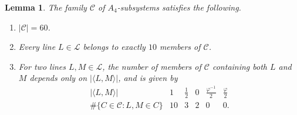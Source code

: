 \documentclass[11pt]{article}
\newtheorem{lemma}[theorem]{Lemma}
\theoremstyle{definition}
\begin{document}
\begin{lemma}\label{lem:app-H4-A4-incidences}
The family \(\mathcal C\) of \(A_{4}\)-subsystems satisfies the following.
\begin{enumerate}
    \item[\textup{(i)}] \(|\mathcal C|=60\).
    \item[\textup{(ii)}] Every line \(L\in\mathcal L\) belongs to exactly
    \(10\) members of \(\mathcal C\).
    \item[\textup{(iii)}] For two lines \(L,M\in\mathcal L\), the number
    of members of \(\mathcal C\) containing both \(L\) and \(M\) depends
    only on \(|\langle L,M\rangle|\), and is given by
    \begin{equation}\label{eq:app-H4-A4-pair-table}
    \begin{array}{c|ccccc}
    |\langle L,M\rangle|
    & 1 & \frac{1}{2} & 0 & \frac{\varphi^{-1}}{2} & \frac{\varphi}{2} \\
    \hline
    \#\{C\in\mathcal C:L,M\in C\}
    & 10 & 3 & 2 & 0 & 0 .
    \end{array}
    \end{equation}
\end{enumerate}
\end{lemma}
\end{document}
